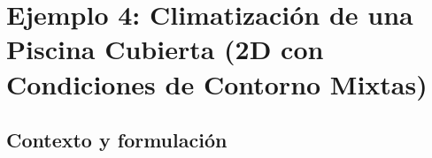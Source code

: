 %
%
%
%
%

\section{Ejemplo 4: Climatización de una Piscina Cubierta (2D con Condiciones de Contorno Mixtas)}
\label{sec:ejemplo_piscina}

\subsection{Contexto y formulación}

